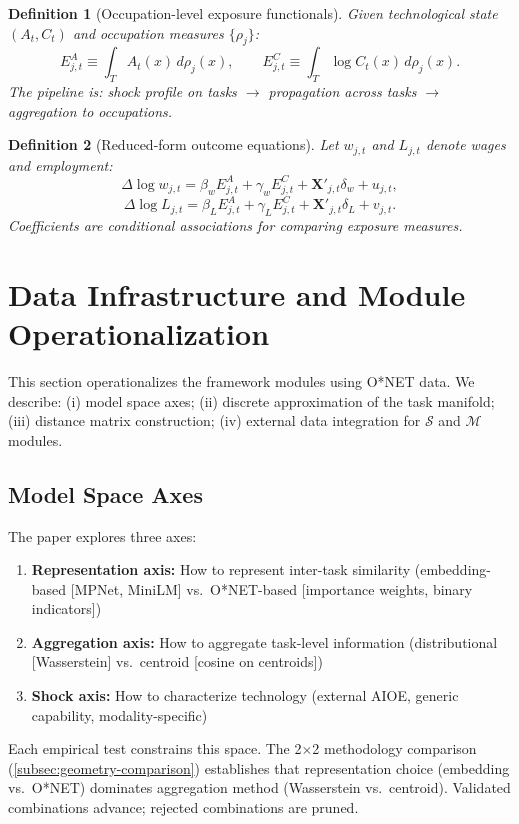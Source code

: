 \documentclass[12pt]{article}
\newtheorem{definition}{Definition}[section]
\begin{document}
\begin{definition}[Occupation-level exposure functionals]
\label{def:exposure-functionals}
Given technological state $(A_t, C_t)$ and occupation measures $\{\rho_j\}$:
\[
E^A_{j,t} \equiv \int_T A_t(x)\, d\rho_j(x), \qquad E^C_{j,t} \equiv \int_T \log C_t(x)\, d\rho_j(x).
\]
The pipeline is: shock profile on tasks $\to$ propagation across tasks $\to$ aggregation to occupations.
\end{definition}


\begin{definition}[Reduced-form outcome equations]
\label{def:reduced-form}
Let $w_{j,t}$ and $L_{j,t}$ denote wages and employment:
\[
\Delta \log w_{j,t} = \beta_w E^A_{j,t} + \gamma_w E^C_{j,t} + \bm{X}'_{j,t} \delta_w + u_{j,t},
\]
\[
\Delta \log L_{j,t} = \beta_L E^A_{j,t} + \gamma_L E^C_{j,t} + \bm{X}'_{j,t} \delta_L + v_{j,t}.
\]
Coefficients are conditional associations for comparing exposure measures.
\end{definition}


\section{Data Infrastructure and Module Operationalization}
\label{sec:data}


This section operationalizes the framework modules using O*NET data. We describe: (i) model space axes; (ii) discrete approximation of the task manifold; (iii) distance matrix construction; (iv) external data integration for $\mathcal{S}$ and $\mathcal{M}$ modules.


\subsection{Model Space Axes}
\label{subsec:model-space}


The paper explores three axes:
\begin{enumerate}
    \item \textbf{Representation axis:} How to represent inter-task similarity (embedding-based [MPNet, MiniLM] vs.\ O*NET-based [importance weights, binary indicators])
    \item \textbf{Aggregation axis:} How to aggregate task-level information (distributional [Wasserstein] vs.\ centroid [cosine on centroids])
    \item \textbf{Shock axis:} How to characterize technology (external AIOE, generic capability, modality-specific)
\end{enumerate}
Each empirical test constrains this space. The 2$\times$2 methodology comparison (\cref{subsec:geometry-comparison}) establishes that representation choice (embedding vs.\ O*NET) dominates aggregation method (Wasserstein vs.\ centroid). Validated combinations advance; rejected combinations are pruned.
\end{document}
